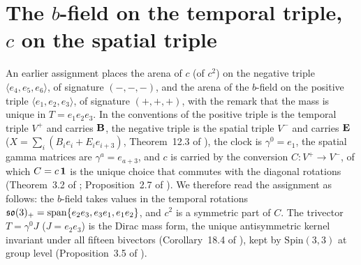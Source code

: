 \section{\texorpdfstring{The $b$-field on the temporal triple, $c$ on the spatial triple}{The b-field on the temporal triple, c on the spatial triple}}
\label{e6:sec:main}

An earlier assignment places the arena of $c$ (of $c^2$) on the negative triple $\langle e_4,e_5,e_6\rangle$, of signature $(-,-,-)$, and the
arena of the $b$-field on the positive triple $\langle e_1,e_2,e_3\rangle$, of signature $(+,+,+)$, with the remark that the mass is unique in
$T=e_1e_2e_3$. In the conventions of \cite{ES17} the positive triple is the temporal triple $V^+$ and carries $\mathbf B$, the negative triple is
the spatial triple $V^-$ and carries $\mathbf E$ ($X=\sum_i(B_ie_i+E_ie_{i+3})$, Theorem~12.3 of \cite{ES17}), the clock is $\gamma^0=e_1$, the spatial
gamma matrices are $\gamma^a=e_{a+3}$, and $c$ is carried by the conversion $C\colon V^+\to V^-$, of which $C=c\,\mathbf 1$ is the unique choice that
commutes with the diagonal rotations (Theorem~3.2 of \cite{ES17}; Proposition~2.7 of \cite{RE}). We therefore read the assignment as follows:
the $b$-field takes values in the temporal rotations $\mathfrak{so}(3)_+=\operatorname{span}\{e_2e_3,e_3e_1,e_1e_2\}$, and $c^2$ is a symmetric part of $C$.
The trivector $T=\gamma^0J$ ($J=e_2e_3$) is the Dirac mass form, the unique antisymmetric kernel invariant under all fifteen bivectors
(Corollary~18.4 of \cite{ES17}), kept by $\mathrm{Spin}(3,3)$ at group level (Proposition~3.5 of \cite{RE}).

